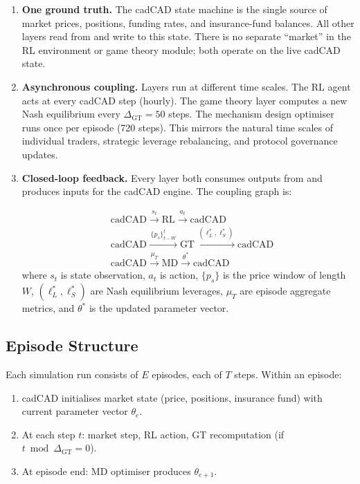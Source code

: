 \documentclass[10pt,twocolumn]{article}
\theoremstyle{plain}
\theoremstyle{definition}
\begin{document}
\begin{enumerate}[leftmargin=*,noitemsep]
\item \textbf{One ground truth.}  The cadCAD state machine
  is the single source of market prices, positions,
  funding rates, and insurance-fund balances.  All other
  layers read from and write to this state.  There is
  no separate ``market'' in the RL environment or game
  theory module; both operate on the live cadCAD state.

\item \textbf{Asynchronous coupling.}  Layers run at
  different time scales.  The RL agent acts at every
  cadCAD step (hourly).  The game theory layer computes
  a new Nash equilibrium every $\Delta_{\mathrm{GT}} = 50$
  steps.  The mechanism design optimiser runs once per
  episode (720 steps).  This mirrors the natural time
  scales of individual traders, strategic leverage
  rebalancing, and protocol governance updates.

\item \textbf{Closed-loop feedback.}  Every layer both
  consumes outputs from and produces inputs for the
  cadCAD engine.  The coupling graph is:

\begin{align}
  &\text{cadCAD} \xrightarrow{\,s_t\,} \text{RL}
    \xrightarrow{\,a_t\,} \text{cadCAD} \nonumber\\
  &\text{cadCAD} \xrightarrow{\,\{p_s\}_{t-W}^{t}\,} \text{GT}
    \xrightarrow{\,(\ell^*_L,\ell^*_S)\,} \text{cadCAD} \nonumber\\
  &\text{cadCAD} \xrightarrow{\,\mu_T\,} \text{MD}
    \xrightarrow{\,\theta^*\,} \text{cadCAD} \nonumber
\end{align}
where $s_t$ is state observation, $a_t$ is action,
$\{p_s\}$ is the price window of length $W$,
$(\ell^*_L, \ell^*_S)$ are Nash equilibrium leverages,
$\mu_T$ are episode aggregate metrics, and $\theta^*$
is the updated parameter vector.
\end{enumerate}

\subsection{Episode Structure}

Each simulation run consists of $E$ episodes, each of
$T$ steps.  Within an episode:
\begin{enumerate}[leftmargin=*,noitemsep]
\item cadCAD initialises market state (price, positions,
  insurance fund) with current parameter vector $\theta_e$.
\item At each step $t$: market step, RL action, GT
  recomputation (if $t \bmod \Delta_{\mathrm{GT}} = 0$).
\item At episode end: MD optimiser produces $\theta_{e+1}$.
\end{enumerate}
\end{document}
